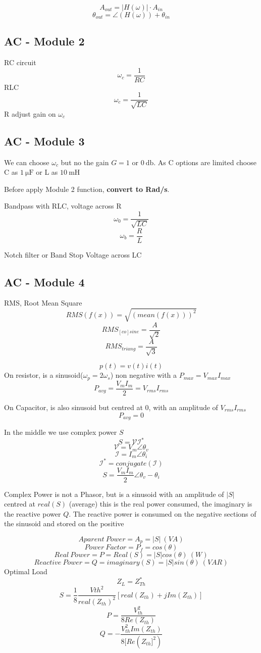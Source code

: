 \documentclass[]{article}
\begin{document}
$$ A_{out} = |H(\omega)|\cdot A_{in} $$
$$ \theta_{out}=\angle(H(\omega)) + \theta_{in}$$

\subsection{AC - Module 2}
RC circuit
$$\omega _c=\frac{1}{RC}$$ 
RLC
$$\omega _c=\frac{1}{\sqrt{LC}}$$
R adjust gain on $\omega _c$ 
\subsection{AC - Module 3}
We can choose $\omega _c$ but no the gain $G = 1$ or $\SI{0}{\decibel}$. As C options are limited choose C as $\SI{1}{\micro \farad}$ or L as $\SI{10}{\milli\henry}$

Before apply Module 2 function, \textbf{convert to Rad/s}.

Bandpass with RLC, voltage across R
$$\omega _ 0 = \frac{1}{\sqrt{LC}}$$
$$\omega _b = \frac{R}{L}$$

Notch filter or Band Stop Voltage across LC
\subsection{AC - Module 4}
RMS, Root Mean  Square
$$RMS (f(x)) =\sqrt{(mean(f(x)))^2} $$
$$RMS_{[co]sine}=\frac{A}{\sqrt{2}}$$
$$RMS_{triang}=\frac{A}{\sqrt{3}}$$


$$p(t)=v(t)i(t)$$
On resistor, is a sinusoid($\omega_p=2\omega_s$) non negative with a $P_{max}=V_{max}I_{max}$
$$P_{avg}=\frac{V_mI_m}{2}=V_{rms}I_{rms}$$

On Capacitor, is also sinusoid but centred at 0, with an amplitude of $V_{rms}I_{rms}$
$$P_{avg}=0$$

In the middle we use complex power $S$
$$S=\mathcal{VI^*}$$
$$\mathcal{V}=V_m\angle{\theta_v}$$
$$\mathcal{I}=I_m\angle{\theta_i}$$
$$\mathcal{I^*}=conjugate(\mathcal{I})$$
$$S=\frac{V_mI_m}{2}\angle{\theta_v-\theta_i}$$

Complex Power is not a Phasor, but is a sinusoid with an amplitude of $|S|$ centred at $real(S)$ (average) this is the real power consumed, the imaginary is the reactive power $Q$. The reactive power is consumed on the negative sections of the sinusoid and stored on the positive

$$Aparent\ Power=A_p=|S|\ (VA)$$
$$Power\ Factor=P_f=cos(\theta)$$
$$Real\ Power=P=Real(S)=|S|cos(\theta)\ (W)$$ 
$$Reactive\ Power=Q=imaginary(S)=|S|sin(\theta)\ (VAR)$$
 Optimal Load
 $$Z_L=Z_{Th}^*$$
 $$ S= \frac{1}{8}\frac{Vth^2}{real(Z_{th})^2}[real(Z_{th})+jIm(Z_{th})]$$
$$P=\frac{V_{th}^2}{8Re(Z_{th})}$$
$$Q=-\frac{V_{th}^2Im(Z_{th})}{8[Re(Z_{th}]^2)}$$
\end{document}
